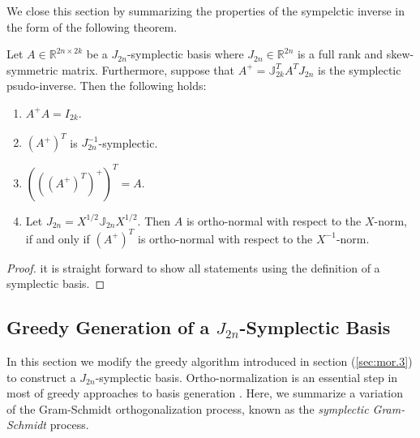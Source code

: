 We close this section by summarizing the properties of the sympelctic inverse in the form of the following theorem.
\begin{theorem} \label{thm:2}
Let $A\in \mathbb R^{2n\times 2k}$ be a $J_{2n}$-symplectic basis where $J_{2n}\in\mathbb R^{2n}$ is a full rank and skew-symmetric matrix. Furthermore, suppose that $A^{+} = \mathbb{J}_{2k}^T A^T J_{2n}$ is the symplectic psudo-inverse. Then the following holds:
\begin{enumerate}
\item $A^+A = I_{2k}$.
\item $(A^+)^T$ is $J_{2n}^{-1}$-symplectic.
\item $\left(\left(\left(A^+\right)^T\right)^+\right)^T = A$.
\item Let $J_{2n}=X^{1/2}\mathbb J_{2n} X^{1/2}$. Then $A$ is ortho-normal with respect to the $X$-norm, if and only if $(A^+)^T$ is ortho-normal with respect to the $X^{-1}$-norm.
\end{enumerate}
\end{theorem}
\begin{proof}
it is straight forward to show all statements using the definition of a symplectic basis.
\end{proof}

\subsection{Greedy Generation of a $J_{2n}$-Symplectic Basis} \label{sec:normmor.2}
In this section we modify the greedy algorithm introduced in section (\ref{sec:mor.3}) to construct a $J_{2n}$-symplectic basis. Ortho-normalization is an essential step in most of greedy approaches to basis generation \cite{hesthaven2015certified,quarteroni2015reduced}. Here, we summarize a variation of the Gram-Schmidt orthogonalization process, known as the \emph{symplectic Gram-Schmidt} process.

